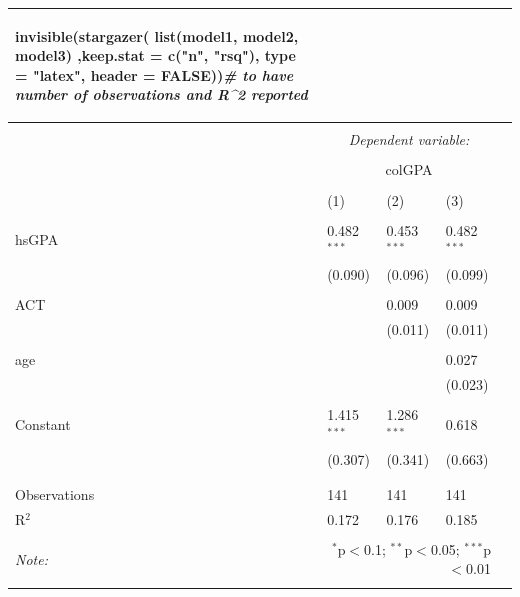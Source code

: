 \documentclass[]{book}
\newenvironment{Shaded}{\begin{snugshade}}{\end{snugshade}}
\newcommand{\CommentTok}[1]{\textcolor[rgb]{0.56,0.35,0.01}{\textit{#1}}}
\newcommand{\DataTypeTok}[1]{\textcolor[rgb]{0.13,0.29,0.53}{#1}}
\newcommand{\KeywordTok}[1]{\textcolor[rgb]{0.13,0.29,0.53}{\textbf{#1}}}
\newcommand{\NormalTok}[1]{#1}
\newcommand{\OtherTok}[1]{\textcolor[rgb]{0.56,0.35,0.01}{#1}}
\newcommand{\StringTok}[1]{\textcolor[rgb]{0.31,0.60,0.02}{#1}}
\begin{document}
\begin{tabularx}{0.455555555555556\textwidth}{p{} p{} p{} p{} p{}}
\begin{Shaded}
\begin{Highlighting}[]
\KeywordTok{invisible}\NormalTok{(}\KeywordTok{stargazer}\NormalTok{(}
  \KeywordTok{list}\NormalTok{(model1, }
\NormalTok{       model2,}
\NormalTok{       model3)}
\NormalTok{  ,}\DataTypeTok{keep.stat =} \KeywordTok{c}\NormalTok{(}\StringTok{"n"}\NormalTok{, }\StringTok{"rsq"}\NormalTok{), }\DataTypeTok{type =} \StringTok{"latex"}\NormalTok{, }\DataTypeTok{header =} \OtherTok{FALSE}\NormalTok{))}\CommentTok{# to have number of observations and R^2 reported}
\end{Highlighting}
\end{Shaded}

\begin{table}[!htbp] \centering 
  \caption{} 
  \label{} 
\begin{tabular}{@{\extracolsep{5pt}}lccc} 
\\[-1.8ex]\hline 
\hline \\[-1.8ex] 
 & \multicolumn{3}{c}{\textit{Dependent variable:}} \\ 
\cline{2-4} 
\\[-1.8ex] & \multicolumn{3}{c}{colGPA} \\ 
\\[-1.8ex] & (1) & (2) & (3)\\ 
\hline \\[-1.8ex] 
 hsGPA & 0.482$^{***}$ & 0.453$^{***}$ & 0.482$^{***}$ \\ 
  & (0.090) & (0.096) & (0.099) \\ 
  & & & \\ 
 ACT &  & 0.009 & 0.009 \\ 
  &  & (0.011) & (0.011) \\ 
  & & & \\ 
 age &  &  & 0.027 \\ 
  &  &  & (0.023) \\ 
  & & & \\ 
 Constant & 1.415$^{***}$ & 1.286$^{***}$ & 0.618 \\ 
  & (0.307) & (0.341) & (0.663) \\ 
  & & & \\ 
\hline \\[-1.8ex] 
Observations & 141 & 141 & 141 \\ 
R$^{2}$ & 0.172 & 0.176 & 0.185 \\ 
\hline 
\hline \\[-1.8ex] 
\textit{Note:}  & \multicolumn{3}{r}{$^{*}$p$<$0.1; $^{**}$p$<$0.05; $^{***}$p$<$0.01} \\ 
\end{tabular} 
\end{table}


\end{tabularx}
\end{document}
